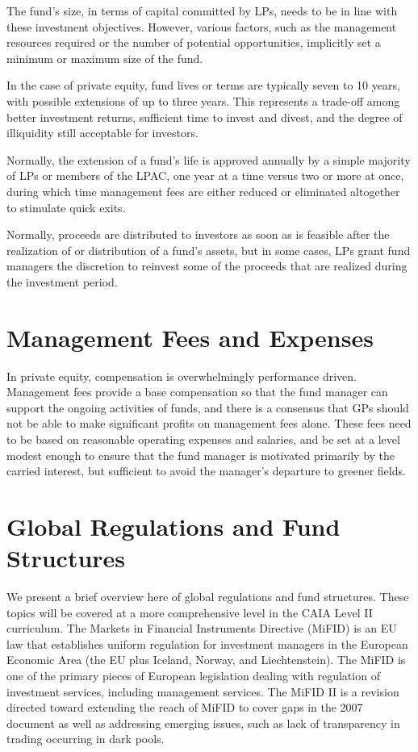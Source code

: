 \documentclass[11pt]{article}
\begin{document}
The fund's size, in terms of capital committed by LPs, needs to be in line with these investment objectives. However, various factors, such as the management resources required or the number of potential opportunities, implicitly set a minimum or maximum size of the fund.

In the case of private equity, fund lives or terms are typically seven to 10 years, with possible extensions of up to three years. This represents a trade-off among better investment returns, sufficient time to invest and divest, and the degree of illiquidity still acceptable for investors.

Normally, the extension of a fund's life is approved annually by a simple majority of LPs or members of the LPAC, one year at a time versus two or more at once, during which time management fees are either reduced or eliminated altogether to stimulate quick exits.

Normally, proceeds are distributed to investors as soon as is feasible after the realization of or distribution of a fund's assets, but in some cases, LPs grant fund managers the discretion to reinvest some of the proceeds that are realized during the investment period.

\section*{Management Fees and Expenses}
In private equity, compensation is overwhelmingly performance driven. Management fees provide a base compensation so that the fund manager can support the ongoing activities of funds, and there is a consensus that GPs should not be able to make significant profits on management fees alone. These fees need to be based on reasonable operating expenses and salaries, and be set at a level modest enough to ensure that the fund manager is motivated primarily by the carried interest, but sufficient to avoid the manager's departure to greener fields.

\section*{Global Regulations and Fund Structures}
We present a brief overview here of global regulations and fund structures. These topics will be covered at a more comprehensive level in the CAIA Level II curriculum. The Markets in Financial Instruments Directive (MiFID) is an EU law that establishes uniform regulation for investment managers in the European Economic Area (the EU plus Iceland, Norway, and Liechtenstein). The MiFID is one of the primary pieces of European legislation dealing with regulation of investment services, including management services. The MiFID II is a revision directed toward extending the reach of MiFID to cover gaps in the 2007 document as well as addressing emerging issues, such as lack of transparency in trading occurring in dark pools.
\end{document}
